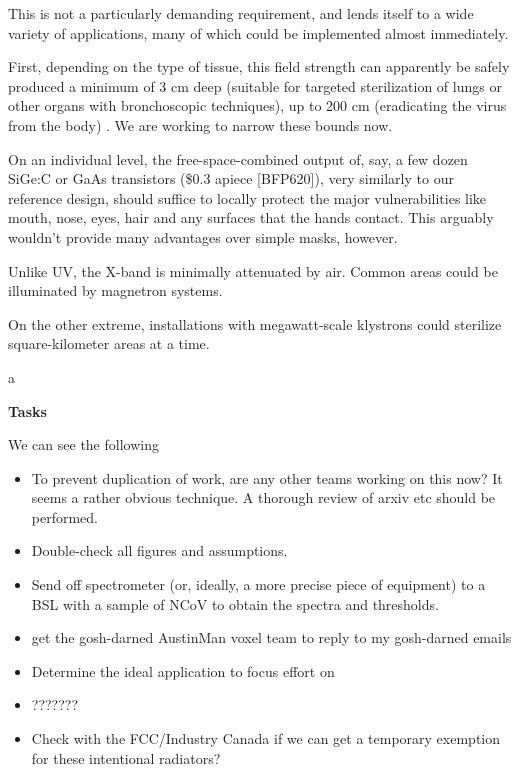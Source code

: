 \documentclass[fleqn,10pt]{paper}
\begin{document}
This is not a particularly demanding requirement, and lends itself to a wide variety of applications, many of which could be implemented almost immediately. 

First, depending on the type of tissue, this field strength can apparently be safely produced a minimum of 3 cm deep (suitable for targeted sterilization of lungs or other organs with bronchoscopic techniques), up to 200 cm (eradicating the virus from the body) \cite{Physical1982}. We are working to narrow these bounds now.

On an individual level, the free-space-combined output of, say, a few dozen SiGe:C or GaAs transistors (\$0.3 apiece [BFP620]), very similarly to our reference design, should suffice to locally protect the major vulnerabilities like mouth, nose, eyes, hair and any surfaces that the hands contact. This arguably wouldn't provide many advantages over simple masks, however. 

Unlike UV, the X-band is minimally attenuated by air. Common areas could be illuminated by magnetron systems.

On the other extreme, installations with megawatt-scale klystrons could sterilize square-kilometer areas at a time. 


\begin{autem}
	a
\end{autem}


{\Large \textbf{Tasks}}

We can see the following 

\begin{itemize}
	\item To prevent duplication of work, are any other teams working on this now? It seems a rather obvious technique. A thorough review of arxiv etc should be performed.
	\item Double-check all figures and assumptions.
	\item Send off spectrometer (or, ideally, a more precise piece of equipment) to a BSL with a sample of NCoV to obtain the spectra and thresholds.
	\item get the gosh-darned AustinMan voxel team to reply to my gosh-darned emails
	\item Determine the ideal application to focus effort on
	\item ???????
	\item Check with the FCC/Industry Canada if we can get a temporary exemption for these intentional radiators?
	
\end{itemize}


\clearpage




\printbibliography[heading=none, title={}]
\end{document}
